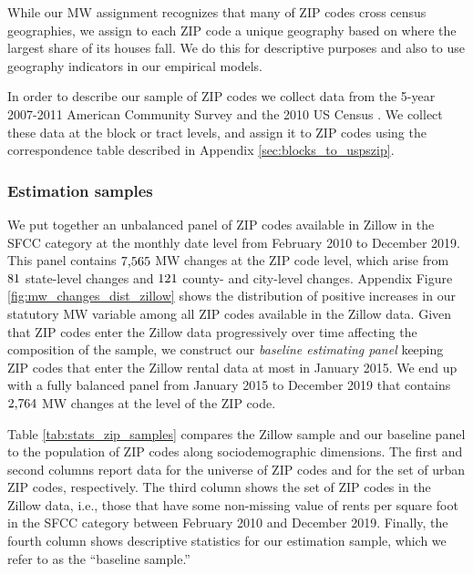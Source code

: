 While our MW assignment recognizes that many of ZIP codes cross census 
geographies, we assign to each ZIP code a unique geography based on where the 
largest share of its houses fall.
We do this for descriptive purposes and also to use geography indicators 
in our empirical models.

In order to describe our sample of ZIP codes we collect data from 
the 5-year 2007-2011 American Community Survey \parencite[ACS;][]{CensusACS} and
the 2010 US Census \parencite{CensusDecennial}.
We collect these data at the block or tract levels, and assign it to ZIP codes
using the correspondence table described in Appendix \ref{sec:blocks_to_uspszip}.

\subsubsection{Estimation samples}\label{sec:data_final_panel}

We put together an unbalanced panel of ZIP codes available in Zillow in the SFCC 
category at the monthly date level from February 2010 to December 2019.
This panel contains $\textnormal{7,565}$ MW changes at the ZIP code level, 
which arise from $\textnormal{81}$ state-level changes and 
$\textnormal{121}$ county- and city-level changes.
Appendix Figure \ref{fig:mw_changes_dist_zillow} shows the distribution of 
positive increases in our statutory MW variable among all ZIP codes available 
in the Zillow data.
Given that ZIP codes enter the Zillow data progressively over time affecting 
the composition of the sample,
we construct our \textit{baseline estimating panel} keeping ZIP codes that enter 
the Zillow rental data at most in January 2015.
We end up with a fully balanced panel from January 2015 to December 2019
that contains $\textnormal{2,764}$ MW changes at the level of the ZIP code.

Table \ref{tab:stats_zip_samples} compares the Zillow sample and our baseline 
panel to the population of ZIP codes along sociodemographic dimensions. 
The first and second columns report data for the universe of ZIP codes and 
for the set of urban ZIP codes, respectively.
The third column shows the set of ZIP codes in the Zillow data, i.e., those 
that have some non-missing value of rents per square foot in the SFCC category 
between February 2010 and December 2019.
Finally, the fourth column shows descriptive statistics for our estimation 
sample, which we refer to as the ``baseline sample.''

